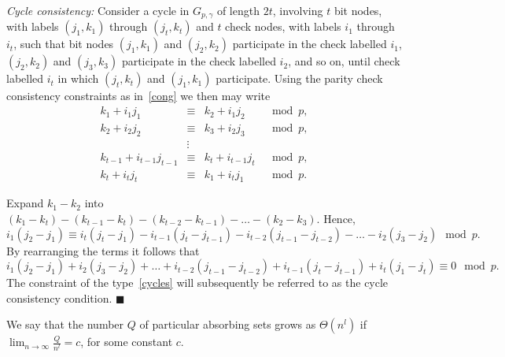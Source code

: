 \textit{Cycle consistency:} Consider a cycle in $G_{p,\gamma}$ of
length $2t$, involving $t$ bit nodes, with labels $(j_1,k_1)$
through $(j_t,k_t)$ and $t$ check nodes, with labels $i_1$ through
$i_t$, such that bit nodes $(j_1,k_1)$ and $(j_2,k_2)$ participate
in the check labelled $i_1$, $(j_2,k_2)$ and $(j_3,k_3)$
participate in the check labelled $i_2$, and so on, until check
labelled $i_t$ in which $(j_t,k_t)$ and $(j_1,k_1)$ participate.
Using the parity check consistency constraints as in~\eqref{cong}
we then may write
\begin{equation}\begin{array}{cccc}
k_1+i_1j_1 &\equiv&k_2+i_1j_2 & \mod p, \\
k_2+i_2j_2 &\equiv&k_3+i_2j_3 & \mod p, \\
{} & \vdots & {}\\
k_{t-1}+i_{t-1}j_{t-1} &\equiv&k_t+i_{t-1}j_t & \mod p, \\
k_t+i_tj_t &\equiv&k_1+i_tj_1 & \mod p.
\end{array}\end{equation}

Expand $k_1-k_2$ into
$(k_1-k_t)-(k_{t-1}-k_t)-(k_{t-2}-k_{t-1})-\dots-(k_2-k_3)$.
Hence,
\begin{equation}
i_1(j_2-j_1) \equiv
i_t(j_t-j_1)-i_{t-1}(j_t-j_{t-1})-i_{t-2}(j_{t-1}-j_{t-2})-\dots-i_2(j_3-j_2)
\mod p.
\end{equation} By rearranging the terms it follows that
\begin{equation}\label{cycles}
i_1(j_2-j_1)+i_2(j_3-j_2)+\dots+i_{t-2}(j_{t-1}-j_{t-2})+i_{t-1}(j_t-j_{t-1})+
i_t(j_1-j_t) \equiv 0 \mod p.
\end{equation}
The constraint of the type~\eqref{cycles} will subsequently be
referred to as the cycle consistency condition.
\hfill$\blacksquare$

We say that the number $Q$ of particular absorbing sets  grows as
$\Theta(n^l)$ if $\lim_{n\rightarrow \infty} \frac{Q}{n^l} = c$,
for some constant $c$.

